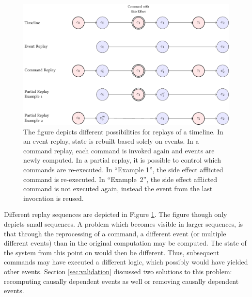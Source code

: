 \begin{figure}
	\centering
	\includegraphics[width=1.0\textwidth]{../illustrations/partial-replay2.pdf}
	\caption{
		The figure depicts different possibilities for replays of a timeline.
		In an event replay, state is rebuilt based solely on events. 
		In a command replay, each command is invoked again and events are 
		newly computed. %
		In a partial replay, it is possible to control which commands are re-executed.
		In ``Example 1'', the side effect afflicted command is re-executed.  
		In \mbox{``Example 2''}, the side effect afflicted command is not executed again, 
		instead the event from the last invocation is reused. 
	}
	\label{fig:partial-replay}
\end{figure}

Different replay sequences are depicted in Figure \ref{fig:partial-replay}.
The figure though only depicts small sequences. A problem which becomes visible 
in larger sequences, is that through the reprocessing of a command, a different 
event (or multiple different events) than in the original computation may be 
computed. The state of the system from this point on would then be different. 
Thus, subsequent commands may have executed a different logic, which possibly 
would have yielded other events.
Section \ref{sec:validation} discussed two solutions to this problem: 
recomputing causally dependent events as well or removing causally dependent 
events. 

